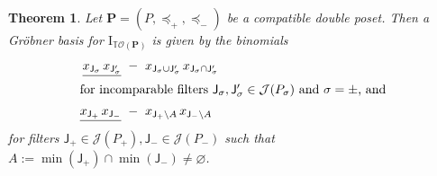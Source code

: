 \documentclass[11pt]{amsart}
\newtheorem{thm}{Theorem}[section]
\theoremstyle{definition}
\begin{document}
\begin{thm}\label{thm:TO_GB}
    Let ${\mathbf{P}} = ({P},\preceq_+,\preceq_-)$ be a compatible double poset. Then
    a Gr\"obner basis for ${\mathrm{I}}_{{{\mathbb{T}}{\mathcal{O}({\mathbf{P}})}}}$ is given by the binomials
    \begin{align}
        \label{eqn:dHibi_rels}
        \underline{x_{{\mathsf{J}}_\sigma}\, x_{{\mathsf{J}}_\sigma'}} \ &- \
        x_{{\mathsf{J}}_\sigma \cup {\mathsf{J}}_\sigma'} \, x_{{\mathsf{J}}_\sigma \cap
        {\mathsf{J}}_\sigma'}\\
                \intertext{for incomparable filters ${\mathsf{J}}_\sigma,{\mathsf{J}}_\sigma'
        \in {{\mathcal{J}}({{P}_\sigma})}$ and $\sigma = \pm$, and }
                \label{eqn:twist_rels}
        \underline{x_{{\mathsf{J}}_+}\, x_{{\mathsf{J}}_-}} \ &- \ x_{{\mathsf{J}}_+\setminus
        A} \, x_{{\mathsf{J}}_-\setminus A}
    \end{align}
    for filters ${\mathsf{J}}_+ \in {{\mathcal{J}}({{P}_+})}, {\mathsf{J}}_- \in {{\mathcal{J}}({{P}_-})}$ such
    that $A := \min({\mathsf{J}}_+)\cap\min({\mathsf{J}}_-) \neq {\varnothing}$.
\end{thm}
\end{document}
